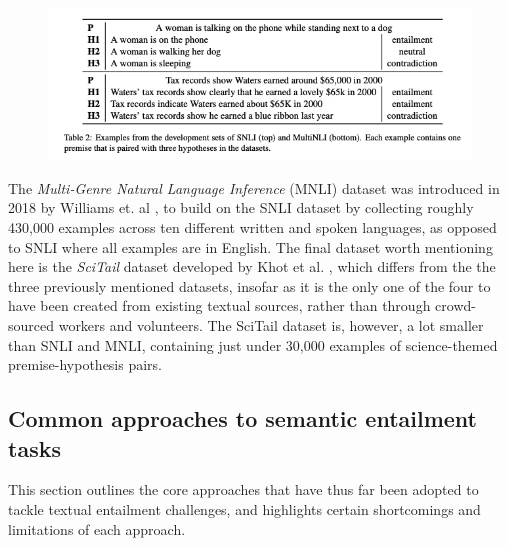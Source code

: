 \documentclass[12pt,twoside]{report}
\begin{document}
\begin{figure}[H]
\centering
\includegraphics[width = 1\hsize]{./figures/SNLI examples.png}
\label{fig:SNLI}
\end{figure}

The \textit{Multi-Genre Natural Language Inference} (MNLI) dataset was introduced in 2018 by Williams et. al \cite{williams-etal-2018-broad}, to build on the SNLI dataset by collecting roughly 430,000 examples across ten different written and spoken languages, as opposed to SNLI where all examples are in English. The final dataset worth mentioning here is the \textit{SciTail} dataset developed by Khot et al. \cite{Khot_Sabharwal_Clark_2018}, which differs from the the three previously mentioned datasets, insofar as it is the only one of the four to have been created from existing textual sources, rather than through crowd-sourced workers and volunteers. The SciTail dataset is, however, a lot smaller than SNLI and MNLI, containing just under 30,000 examples of science-themed premise-hypothesis pairs. \newline \par


\subsection{Common approaches to semantic entailment tasks}

This section outlines the core approaches that have thus far been adopted to tackle textual entailment challenges, and highlights certain shortcomings and limitations of each approach. \newline \par
\end{document}
